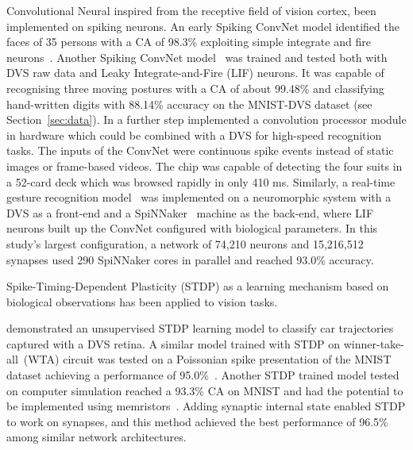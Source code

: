 Convolutional Neural \protect{} \protect{} inspired from the receptive field of vision cortex, \protect{} \protect{} been implemented on spiking neurons.
An early Spiking ConvNet model identified the faces of 35 persons with a CA of 98.3\% exploiting simple integrate and fire neurons~\citep{matsugu2002convolutional}.
Another Spiking ConvNet model~\citep{zhao2014feedforward} was trained and tested both with DVS raw data and Leaky Integrate-and-Fire (LIF) neurons.
It was capable of recognising three moving postures with a CA of about 99.48\% and classifying hand-written digits with 88.14\% accuracy on the MNIST-DVS dataset (see Section~\ref{sec:data}).
In a further step \protect{} \protect{}\citet{camunas2012event} implemented a convolution processor module in hardware which could be combined with a DVS for high-speed recognition tasks.
The inputs of the ConvNet were continuous spike events instead of static images or frame-based videos. 
The chip was capable of detecting the four suits in a 52-card deck which was browsed rapidly in only 410 ms.
Similarly, a real-time gesture recognition model~\citep{liu2014real} was implemented on a neuromorphic system with a DVS as a front-end and a SpiNNaker~\citep{furber2014spinnaker} machine as the back-end, where LIF neurons built up the ConvNet configured with biological parameters.
In this study's largest configuration, a network of 74,210 neurons and 15,216,512 synapses used 290 SpiNNaker cores in parallel and reached 93.0\% accuracy. 

Spike-Timing-Dependent Plasticity (STDP) as  a learning mechanism based on biological observations has been applied to vision tasks.

\citet{bichler2012extraction} demonstrated an unsupervised STDP learning model to classify car trajectories captured with a DVS retina. 
A similar model trained with STDP on winner-take-all~(WTA) circuit was tested on a Poissonian spike presentation of the MNIST dataset achieving a performance of 95.0\%~\citep{diehl2015unsupervised}.
Another STDP trained model tested on computer simulation reached a 93.3\% CA on MNIST and had the potential to be implemented using memristors~\citep{bill2014compound}. 
Adding synaptic internal state enabled STDP to work on \protect{} \protect{} synapses, and this method achieved the best performance of 96.5\% among similar network architectures. 

